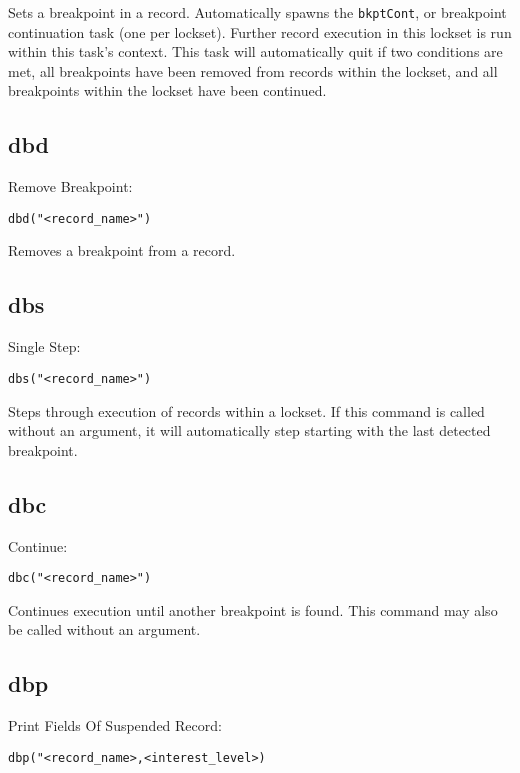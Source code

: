 Sets a breakpoint in a record. Automatically spawns the \verb|bkptCont|, or breakpoint continuation task (one per lockset). 
Further record execution in this lockset is run within this task's context. This task will automatically quit if two conditions 
are met, all breakpoints have been removed from records within the lockset, and all breakpoints within the lockset have 
been continued.

\subsection{dbd}

Remove Breakpoint:

\begin{verbatim}
dbd("<record_name>")
\end{verbatim}

Removes a breakpoint from a record.

\subsection{dbs}

Single Step:

\begin{verbatim}
dbs("<record_name>")
\end{verbatim}

Steps through execution of records within a lockset. If this command is called without an argument, it will automatically 
step starting with the last detected breakpoint.

\subsection{dbc}

Continue:

\begin{verbatim}
dbc("<record_name>")
\end{verbatim}

Continues execution until another breakpoint is found. This command may also be called without an argument.

\subsection{dbp }

Print Fields Of Suspended Record:

\begin{verbatim}
dbp("<record_name>,<interest_level>)
\end{verbatim}

